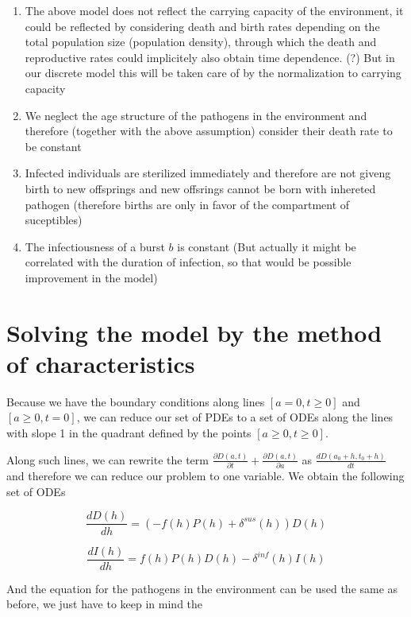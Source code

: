 \documentclass[10pt]{article}         %
\begin{document}
\begin{enumerate}
\item The above model does not reflect the carrying capacity of the environment, it could be reflected by considering death and birth rates depending on the total population size (population density), through which the death and reproductive rates could implicitely also obtain time dependence. (?) But in our discrete model this will be taken care of by the normalization to carrying capacity
\item We neglect the age structure of the pathogens in the environment and therefore (together with the above assumption) consider their death rate to be constant
\item Infected individuals are sterilized immediately and therefore are not giveng birth to new offsprings and new offsrings cannot be born with inhereted pathogen (therefore births are only in favor of the compartment of suceptibles)
\item The infectiousness of a burst $b$ is constant (But actually it might be correlated with the duration of infection, so that would be possible improvement in the model)
\end{enumerate}

\section{Solving the model by the method of characteristics}

Because we have the boundary conditions along lines $[a=0, t \geq 0]$ and $[a \geq 0, t=0]$, we can reduce our set of PDEs to a set of ODEs along the lines with slope 1 in the quadrant defined by the points $[a \geq 0, t \geq 0]$.

Along such lines, we can rewrite the term $\frac{\partial D(a,t)}{\partial t} + \frac{\partial D(a,t)}{\partial a}$ as $\frac{dD(a_0 + h,t_0 +h)}{dt}$ and therefore we can reduce our problem to one variable. We obtain the following set of ODEs

\begin{equation}
\frac{dD(h)}{dh} = (-f(h)P(h) + \delta^{sus}(h))D(h)
\end{equation}

\begin{equation}
\frac{dI(h)}{dh} = f(h)P(h)D(h) - \delta^{inf}(h)I(h)
\end{equation}

And the equation for the pathogens in the environment can be used the same as before, we just have to keep in mind the 
\end{document}
